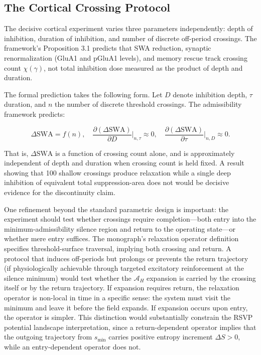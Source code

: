 \documentclass[12pt, a4paper]{article}
\theoremstyle{definition}
\begin{document}
\subsection{The Cortical Crossing Protocol}

The decisive cortical experiment varies three parameters independently: depth of inhibition, duration of inhibition, and number of discrete off-period crossings. The framework's Proposition 3.1 predicts that SWA reduction, synaptic renormalization (GluA1 and pGluA1 levels), and memory rescue track crossing count $\chi(\gamma)$, not total inhibition dose measured as the product of depth and duration.

The formal prediction takes the following form. Let $D$ denote inhibition depth, $\tau$ duration, and $n$ the number of discrete threshold crossings. The admissibility framework predicts:

\begin{equation}
\Delta\text{SWA} = f(n), \quad \frac{\partial(\Delta\text{SWA})}{\partial D}\bigg|_{n,\tau} \approx 0, \quad \frac{\partial(\Delta\text{SWA})}{\partial \tau}\bigg|_{n,D} \approx 0.
\end{equation}

That is, $\Delta\text{SWA}$ is a function of crossing count alone, and is approximately independent of depth and duration when crossing count is held fixed. A result showing that 100 shallow crossings produce relaxation while a single deep inhibition of equivalent total suppression-area does not would be decisive evidence for the discontinuity claim.

One refinement beyond the standard parametric design is important: the experiment should test whether crossings require completion---both entry into the minimum-admissibility silence region and return to the operating state---or whether mere entry suffices. The monograph's relaxation operator definition specifies threshold-surface traversal, implying both crossing and return. A protocol that induces off-periods but prolongs or prevents the return trajectory (if physiologically achievable through targeted excitatory reinforcement at the silence minimum) would test whether the $\mathcal{A}_H$ expansion is carried by the crossing itself or by the return trajectory. If expansion requires return, the relaxation operator is non-local in time in a specific sense: the system must visit the minimum and leave it before the field expands. If expansion occurs upon entry, the operator is simpler. This distinction would substantially constrain the RSVP potential landscape interpretation, since a return-dependent operator implies that the outgoing trajectory from $s_{\min}$ carries positive entropy increment $\Delta S > 0$, while an entry-dependent operator does not.
\end{document}
